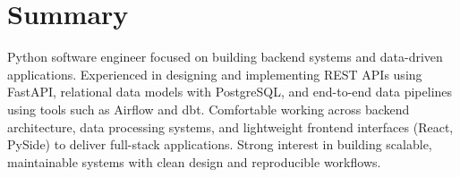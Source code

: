 

\section{Summary}

Python software engineer focused on building backend systems and data-driven applications.
Experienced in designing and implementing REST APIs using FastAPI, relational data models with PostgreSQL,
and end-to-end data pipelines using tools such as Airflow and dbt.
Comfortable working across backend architecture, data processing systems, and lightweight frontend interfaces (React, PySide) to deliver full-stack applications.
Strong interest in building scalable, maintainable systems with clean design and reproducible workflows.
